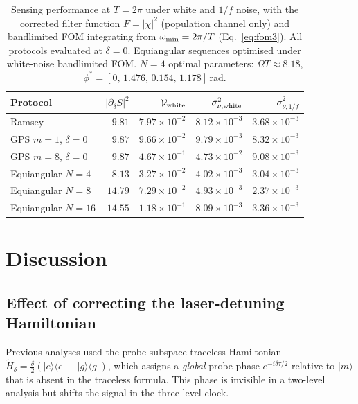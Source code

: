 \documentclass[12pt]{article}
\begin{document}
\begin{table}[h]
\centering
\begin{tabular}{lrrrr}
\toprule
Protocol & $|\partial_\delta S|^2$ & $\mathcal{V}_{\rm white}$ & $\sigma^2_{\nu,{\rm white}}$
         & $\sigma^2_{\nu,1/f}$ \\
\midrule
Ramsey                    & $9.81$  & $7.97\times10^{-2}$ & $8.12\times10^{-3}$ & $3.68\times10^{-3}$ \\
GPS $m{=}1$, $\delta{=}0$ & $9.87$  & $9.66\times10^{-2}$ & $9.79\times10^{-3}$ & $8.32\times10^{-3}$ \\
GPS $m{=}8$, $\delta{=}0$ & $9.87$  & $4.67\times10^{-1}$ & $4.73\times10^{-2}$ & $9.08\times10^{-3}$ \\
Equiangular $N{=}4$       & $8.13$  & $3.27\times10^{-2}$ & $4.02\times10^{-3}$ & $3.04\times10^{-3}$ \\
Equiangular $N{=}8$       & $14.79$ & $7.29\times10^{-2}$ & $4.93\times10^{-3}$ & $2.37\times10^{-3}$ \\
Equiangular $N{=}16$      & $14.55$ & $1.18\times10^{-1}$ & $8.09\times10^{-3}$ & $3.36\times10^{-3}$ \\
\bottomrule
\end{tabular}
\caption{%
    Sensing performance at $T = 2\pi$ under white and $1/f$ noise, with the
    corrected filter function $F = |\chi|^2$ (population channel only) and
    bandlimited FOM integrating from $\omega_{\rm min} = 2\pi/T$ (Eq.~\eqref{eq:fom3}).
    All protocols evaluated at $\delta = 0$.
    Equiangular sequences optimised under white-noise bandlimited FOM.
    $N{=}4$ optimal parameters: $\Omega T \approx 8.18$,
    $\phi^* = [0,\,1.476,\,0.154,\,1.178]$\,rad.%
}
\label{tab:summary}
\end{table}


\section{Discussion}

\subsection*{Effect of correcting the laser-detuning Hamiltonian}

Previous analyses used the probe-subspace-traceless Hamiltonian
$\tilde{H}_\delta = \frac{\delta}{2}(\lvert e\rangle\langle e\rvert -
\lvert g\rangle\langle g\rvert)$, which assigns a \emph{global} probe phase
$e^{-i\delta\tau/2}$ relative to $\lvert m\rangle$ that is absent in the
traceless formula.  This phase is invisible in a two-level analysis but
shifts the signal in the three-level clock.
\end{document}
